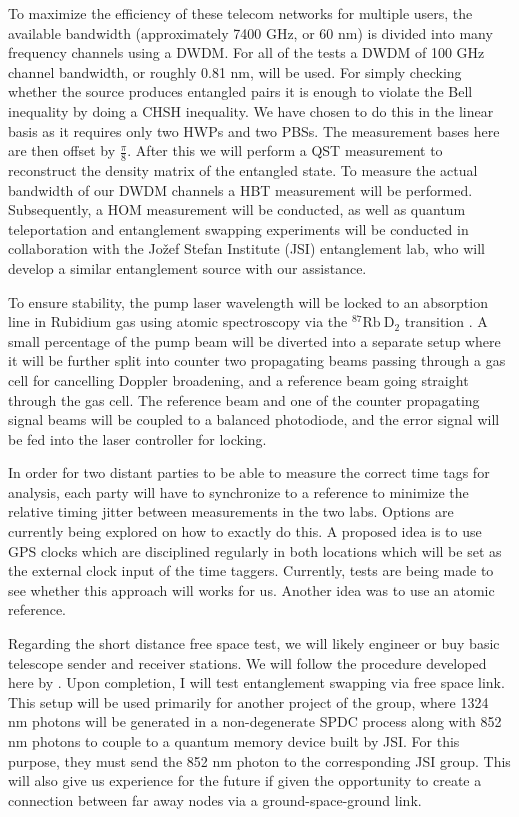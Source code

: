 \documentclass{article}
\begin{document}
\par To maximize the efficiency of these telecom networks for multiple users,
the available bandwidth (approximately 7400 GHz, or 60 nm) is divided into many
frequency channels using a DWDM. For all of the tests a DWDM of 100 GHz channel
bandwidth, or roughly 0.81 nm, will be used. For simply checking whether the
source produces entangled pairs it is enough to violate the Bell inequality by
doing a CHSH \cite{Clauser_Horne_Shimony_Holt_1969} inequality. We have chosen
to do this in the linear basis as it requires only two HWPs and two PBSs. The
measurement bases here are then offset by $\frac{\pi}{8}$. After this we will
perform a QST measurement to reconstruct \cite{James_Kwiat_Munro_White_2001}
the density matrix of the entangled state. To measure the actual bandwidth of
our DWDM channels a HBT measurement will be performed. Subsequently, a HOM
measurement will be conducted, as well as quantum teleportation
\cite{Bouwmeester_Pan_Mattle_Eibl_Weinfurter_Zeilinger_1997} and entanglement
swapping \cite{Jennewein_Weihs_Pan_Zeilinger_2001} experiments will be
conducted in collaboration with the Jožef Stefan Institute (JSI) entanglement
lab, who will develop a similar entanglement source with our assistance.

To ensure stability, the pump laser wavelength will be locked to an absorption
line in Rubidium gas using atomic spectroscopy via the $\mathrm{^{87}Rb\ D_2}$
transition \cite{metger2017sas}. A small percentage of the pump beam will be
diverted into a separate setup where it will be further split into counter two
propagating beams passing through a gas cell for cancelling Doppler broadening,
and a reference beam going straight through the gas cell. The reference beam
and one of the counter propagating signal beams will be coupled to a balanced
photodiode, and the error signal will be fed into the laser controller for
locking.

In order for two distant parties to be able to measure the correct time tags
for analysis, each party will have to synchronize to a reference to minimize
the relative timing jitter between measurements in the two labs. Options are
currently being explored on how to exactly do this. A proposed idea is to use
GPS clocks which are disciplined regularly in both locations which will be set
as the external clock input of the time taggers. Currently, tests are being
made to see whether this approach will works for us. Another idea was to use an
atomic reference.

Regarding the short distance free space test, we will likely engineer or buy
basic telescope sender and receiver stations. We will follow the procedure
developed here by \cite{Kržič_2024}. Upon completion, I will test entanglement
swapping via free space link. This setup will be used primarily for another
project of the group, where 1324 nm photons will be generated in a
non-degenerate SPDC process along with 852 nm photons to couple to a quantum
memory device built by JSI. For this purpose, they must send the 852 nm photon
to the corresponding JSI group. This will also give us experience for the
future if given the opportunity to create a connection between far away nodes
via a ground-space-ground link.
\end{document}
